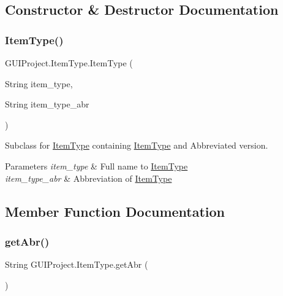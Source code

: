 \subsection{Constructor \& Destructor Documentation}
\mbox{\label{enum_g_u_i_project_1_1_item_type_a162bda10bec618714954bffcb302a36c}} 
\subsubsection{\texorpdfstring{ItemType()}{ItemType()}}
{\footnotesize\ttfamily G\+U\+I\+Project.\+Item\+Type.\+Item\+Type (\begin{DoxyParamCaption}\item[{String}]{item\+\_\+type,  }\item[{String}]{item\+\_\+type\+\_\+abr }\end{DoxyParamCaption})}

Subclass for \mbox{\hyperlink{enum_g_u_i_project_1_1_item_type}{Item\+Type}} containing \mbox{\hyperlink{enum_g_u_i_project_1_1_item_type}{Item\+Type}} and Abbreviated version.


\begin{DoxyParams}{Parameters}
{\em item\+\_\+type} & Full name to \mbox{\hyperlink{enum_g_u_i_project_1_1_item_type}{Item\+Type}} \\
\hline
{\em item\+\_\+type\+\_\+abr} & Abbreviation of \mbox{\hyperlink{enum_g_u_i_project_1_1_item_type}{Item\+Type}} \\
\hline
\end{DoxyParams}


\subsection{Member Function Documentation}
\mbox{\label{enum_g_u_i_project_1_1_item_type_a9b7f30062666c3c26b96b5ec76933731}} 
\subsubsection{\texorpdfstring{getAbr()}{getAbr()}}
{\footnotesize\ttfamily String G\+U\+I\+Project.\+Item\+Type.\+get\+Abr (\begin{DoxyParamCaption}{ }\end{DoxyParamCaption})}

